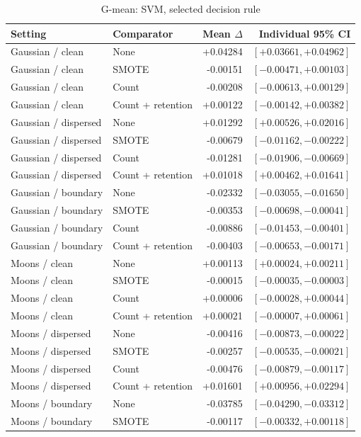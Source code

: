 \begin{table}[htbp]
\caption{G-mean: SVM, selected decision rule}
\centering\small
\begin{tabular}{llrr}
\hline
Setting & Comparator & Mean $\Delta$ & Individual 95\% CI\\
\hline
Gaussian / clean & None & +0.04284 & $[+0.03661, +0.04962]$ \\
Gaussian / clean & SMOTE & -0.00151 & $[-0.00471, +0.00103]$ \\
Gaussian / clean & Count & -0.00208 & $[-0.00613, +0.00129]$ \\
Gaussian / clean & Count + retention & +0.00122 & $[-0.00142, +0.00382]$ \\
Gaussian / dispersed & None & +0.01292 & $[+0.00526, +0.02016]$ \\
Gaussian / dispersed & SMOTE & -0.00679 & $[-0.01162, -0.00222]$ \\
Gaussian / dispersed & Count & -0.01281 & $[-0.01906, -0.00669]$ \\
Gaussian / dispersed & Count + retention & +0.01018 & $[+0.00462, +0.01641]$ \\
Gaussian / boundary & None & -0.02332 & $[-0.03055, -0.01650]$ \\
Gaussian / boundary & SMOTE & -0.00353 & $[-0.00698, -0.00041]$ \\
Gaussian / boundary & Count & -0.00886 & $[-0.01453, -0.00401]$ \\
Gaussian / boundary & Count + retention & -0.00403 & $[-0.00653, -0.00171]$ \\
Moons / clean & None & +0.00113 & $[+0.00024, +0.00211]$ \\
Moons / clean & SMOTE & -0.00015 & $[-0.00035, -0.00003]$ \\
Moons / clean & Count & +0.00006 & $[-0.00028, +0.00044]$ \\
Moons / clean & Count + retention & +0.00021 & $[-0.00007, +0.00061]$ \\
Moons / dispersed & None & -0.00416 & $[-0.00873, -0.00022]$ \\
Moons / dispersed & SMOTE & -0.00257 & $[-0.00535, -0.00021]$ \\
Moons / dispersed & Count & -0.00476 & $[-0.00879, -0.00117]$ \\
Moons / dispersed & Count + retention & +0.01601 & $[+0.00956, +0.02294]$ \\
Moons / boundary & None & -0.03785 & $[-0.04290, -0.03312]$ \\
Moons / boundary & SMOTE & -0.00117 & $[-0.00332, +0.00118]$ \\

\end{tabular}
\end{table}
